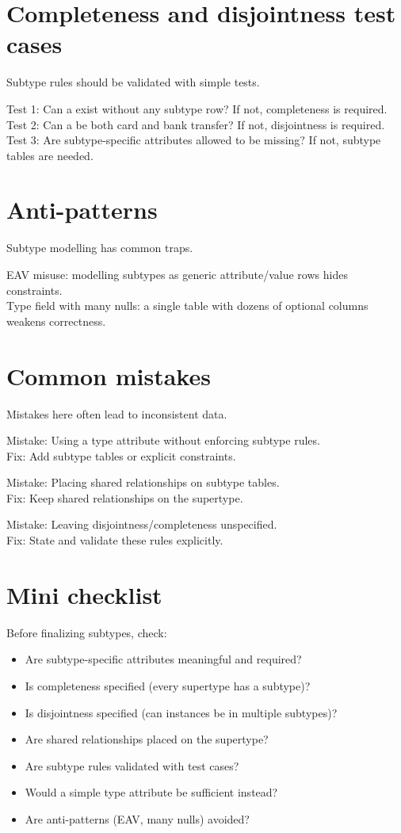\section{Completeness and disjointness test cases}
Subtype rules should be validated with simple tests.

Test 1: Can a  exist without any subtype row? If not, completeness is required.\\
Test 2: Can a  be both card and bank transfer? If not, disjointness is required.\\
Test 3: Are subtype-specific attributes allowed to be missing? If not, subtype tables are needed.

\section{Anti-patterns}
Subtype modelling has common traps.

EAV misuse: modelling subtypes as generic attribute/value rows hides constraints.\\
Type field with many nulls: a single table with dozens of optional columns weakens correctness.

\section{Common mistakes}
Mistakes here often lead to inconsistent data.

Mistake: Using a type attribute without enforcing subtype rules.\\
Fix: Add subtype tables or explicit constraints.

Mistake: Placing shared relationships on subtype tables.\\
Fix: Keep shared relationships on the supertype.

Mistake: Leaving disjointness/completeness unspecified.\\
Fix: State and validate these rules explicitly.

\section{Mini checklist}
Before finalizing subtypes, check:
\begin{itemize}[leftmargin=*,nosep]
  \item Are subtype-specific attributes meaningful and required?
  \item Is completeness specified (every supertype has a subtype)?
  \item Is disjointness specified (can instances be in multiple subtypes)?
  \item Are shared relationships placed on the supertype?
  \item Are subtype rules validated with test cases?
  \item Would a simple type attribute be sufficient instead?
  \item Are anti-patterns (EAV, many nulls) avoided?
\end{itemize}

